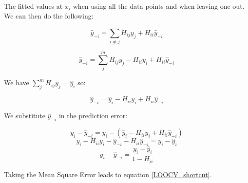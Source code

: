 \noindent The fitted values at $ x_i$ when using all the data points and when leaving one out. We can then do the following:

\[ \hat{y}_{-i} = \sum_{i\neq j}^{} H_{ij} y_j + H_{ii} \hat{y}_{-i} \]

\[ \hat{y}_{-i} = \sum_{j}^{m} H_{ij} y_j - H_{ii} y_i + H_{ii} \hat{y}_{-i} \]

We have $ \sum_{j}^{m} H_{ij} y_j = \hat{y}_{i}$ so:  

\[ \hat{y}_{-i} = \hat{y}_{i} - H_{ii} y_{i} + H_{ii} \hat{y}_{-i}  \]


We substitute $ \hat{y}_{-i} $ in the prediction error: 

\[ y_i - \hat{y}_{-i} = y_i - (\hat{y}_{i} - H_{ii} y_{i} + H_{ii} \hat{y}_{-i} ) \]
\[ y_i - H_{ii}y_{i} - \hat{y}_{-i} - H_{ii}\hat{y}_{-i} = y_i - \hat{y}_i \]
\[ y_i - \hat{y}_{-i} = \frac{y_i - \hat{y}_{i}}{1 - H_{ii}}\]

Taking the Mean Square Error leads to equation \ref{LOOCV_shortcut}. 












